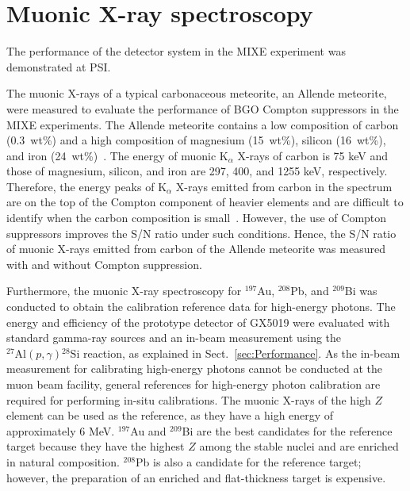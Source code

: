 \section{Muonic X-ray spectroscopy} \label{sec:MIXE}

The performance of the detector system in the MIXE experiment was demonstrated at PSI.

The muonic X-rays of a typical carbonaceous meteorite, an Allende meteorite, were measured to evaluate the performance of BGO Compton suppressors in the MIXE experiments.
The Allende meteorite contains a low composition of carbon (0.3~wt\%) and a high composition of magnesium (15~wt\%), silicon (16~wt\%), and iron (24~wt\%)~\cite{Mason1975-ko, Stracke2012-vw}.
The energy of muonic K$_\alpha$ X-rays of carbon is 75 keV and those of magnesium, silicon, and iron are 297, 400, and 1255 keV, respectively. 
Therefore, the energy peaks of K$_\alpha$ X-rays emitted from carbon in the spectrum are on the top of the Compton component of heavier elements and are difficult to identify when the carbon composition is small~\cite{Terada2014-cw}.
However, the use of Compton suppressors improves the S/N ratio under such conditions.
Hence, the S/N ratio of muonic X-rays emitted from carbon %
of the Allende meteorite was measured with and without Compton suppression.%


Furthermore, the muonic X-ray spectroscopy for $^{197}$Au, $^{208}$Pb, and $^{209}$Bi was conducted to obtain the calibration reference data for high-energy photons. %
The energy and efficiency of the prototype detector of GX5019 were evaluated with standard gamma-ray sources and an in-beam measurement using the $^{27}\mathrm{Al}(p,\gamma){}^{28}\mathrm{Si}$ reaction, as explained in Sect.~\ref{sec:Performance}.
As the in-beam measurement for calibrating high-energy photons cannot be conducted at the muon beam facility, general references %
for high-energy photon calibration are required for performing in-situ calibrations.
The muonic X-rays of the high $Z$ element can be used as the reference, as they have a high energy of approximately 6 MeV. 
$^{197}$Au and $^{209}$Bi are the best candidates for the reference target because they have the highest $Z$ among the stable nuclei and are enriched in natural composition. $^{208}$Pb is also a candidate for the reference target; however, the preparation of an enriched and flat-thickness target is expensive.


